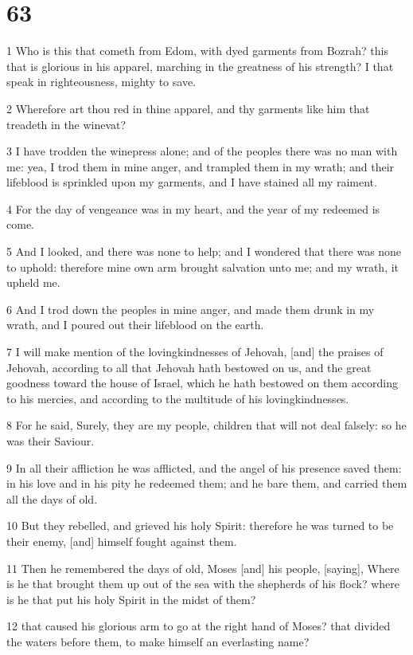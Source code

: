 \chapter{63}

\par 1 Who is this that cometh from Edom, with dyed garments from Bozrah? this that is glorious in his apparel, marching in the greatness of his strength? I that speak in righteousness, mighty to save.
\par 2 Wherefore art thou red in thine apparel, and thy garments like him that treadeth in the winevat?
\par 3 I have trodden the winepress alone; and of the peoples there was no man with me: yea, I trod them in mine anger, and trampled them in my wrath; and their lifeblood is sprinkled upon my garments, and I have stained all my raiment.
\par 4 For the day of vengeance was in my heart, and the year of my redeemed is come.
\par 5 And I looked, and there was none to help; and I wondered that there was none to uphold: therefore mine own arm brought salvation unto me; and my wrath, it upheld me.
\par 6 And I trod down the peoples in mine anger, and made them drunk in my wrath, and I poured out their lifeblood on the earth.
\par 7 I will make mention of the lovingkindnesses of Jehovah, [and] the praises of Jehovah, according to all that Jehovah hath bestowed on us, and the great goodness toward the house of Israel, which he hath bestowed on them according to his mercies, and according to the multitude of his lovingkindnesses.
\par 8 For he said, Surely, they are my people, children that will not deal falsely: so he was their Saviour.
\par 9 In all their affliction he was afflicted, and the angel of his presence saved them: in his love and in his pity he redeemed them; and he bare them, and carried them all the days of old.
\par 10 But they rebelled, and grieved his holy Spirit: therefore he was turned to be their enemy, [and] himself fought against them.
\par 11 Then he remembered the days of old, Moses [and] his people, [saying], Where is he that brought them up out of the sea with the shepherds of his flock? where is he that put his holy Spirit in the midst of them?
\par 12 that caused his glorious arm to go at the right hand of Moses? that divided the waters before them, to make himself an everlasting name?
